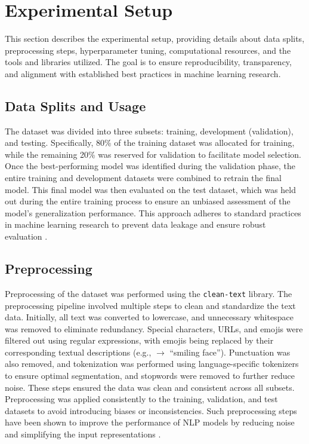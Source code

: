\section{Experimental Setup}

This section describes the experimental setup, providing details about data splits, preprocessing steps, hyperparameter tuning, computational resources, and the tools and libraries utilized. The goal is to ensure reproducibility, transparency, and alignment with established best practices in machine learning research.



\subsection{Data Splits and Usage}
The dataset\cite{muhammad2025brighterbridginggaphumanannotated} was divided into three subsets: training, development (validation), and testing. Specifically, 80\% of the training dataset was allocated for training, while the remaining 20\% was reserved for validation to facilitate model selection. Once the best-performing model was identified during the validation phase, the entire training and development datasets were combined to retrain the final model. This final model was then evaluated on the test dataset, which was held out during the entire training process to ensure an unbiased assessment of the model's generalization performance. This approach adheres to standard practices in machine learning research to prevent data leakage and ensure robust evaluation \citep{Goodfellow-et-al-2016}.

\subsection{Preprocessing}

Preprocessing of the dataset was performed using the \texttt{clean-text} library. The preprocessing pipeline involved multiple steps to clean and standardize the text data. Initially, all text was converted to lowercase, and unnecessary whitespace was removed to eliminate redundancy. Special characters, URLs, and emojis were filtered out using regular expressions, with emojis being replaced by their corresponding textual descriptions (e.g., \smiley $\rightarrow$ ``smiling face''). Punctuation was also removed, and  tokenization was performed using language-specific tokenizers to ensure optimal segmentation, and stopwords were removed to further reduce noise. These steps ensured the data was clean and consistent across all subsets. Preprocessing was applied consistently to the training, validation, and test datasets to avoid introducing biases or inconsistencies. Such preprocessing steps have been shown to improve the performance of NLP models by reducing noise and simplifying the input representations \citep{Zhang2020DataPrep}.

